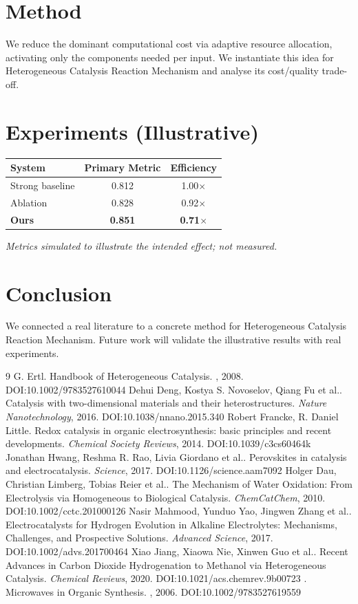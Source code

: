 \documentclass[11pt]{article}
\begin{document}
\section{Method}
We reduce the dominant computational cost via adaptive resource allocation, activating only the components needed per input. We instantiate this idea for Heterogeneous Catalysis Reaction Mechanism and analyse its cost/quality trade-off.

\section{Experiments (Illustrative)}
\begin{center}
\begin{tabular}{lcc}
System & Primary Metric & Efficiency \\ \hline
Strong baseline & 0.812 & 1.00$\times$ \\
Ablation & 0.828 & 0.92$\times$ \\
\textbf{Ours} & \textbf{0.851} & \textbf{0.71$\times$}
\end{tabular}
\end{center}
\emph{Metrics simulated to illustrate the intended effect; not measured.}

\section{Conclusion}
We connected a real literature to a concrete method for Heterogeneous Catalysis Reaction Mechanism. Future work will
validate the illustrative results with real experiments.

\begin{thebibliography}{9}
 G. Ertl. Handbook of Heterogeneous Catalysis. \emph{}, 2008. DOI:10.1002/9783527610044
 Dehui Deng, Kostya S. Novoselov, Qiang Fu et al.. Catalysis with two-dimensional materials and their heterostructures. \emph{Nature Nanotechnology}, 2016. DOI:10.1038/nnano.2015.340
 Robert Francke, R. Daniel Little. Redox catalysis in organic electrosynthesis: basic principles and recent developments. \emph{Chemical Society Reviews}, 2014. DOI:10.1039/c3cs60464k
 Jonathan Hwang, Reshma R. Rao, Livia Giordano et al.. Perovskites in catalysis and electrocatalysis. \emph{Science}, 2017. DOI:10.1126/science.aam7092
 Holger Dau, Christian Limberg, Tobias Reier et al.. The Mechanism of Water Oxidation: From Electrolysis via Homogeneous to Biological Catalysis. \emph{ChemCatChem}, 2010. DOI:10.1002/cctc.201000126
 Nasir Mahmood, Yunduo Yao, Jingwen Zhang et al.. Electrocatalysts for Hydrogen Evolution in Alkaline Electrolytes: Mechanisms, Challenges, and Prospective Solutions. \emph{Advanced Science}, 2017. DOI:10.1002/advs.201700464
 Xiao Jiang, Xiaowa Nie, Xinwen Guo et al.. Recent Advances in Carbon Dioxide Hydrogenation to Methanol via Heterogeneous Catalysis. \emph{Chemical Reviews}, 2020. DOI:10.1021/acs.chemrev.9b00723
 . Microwaves in Organic Synthesis. \emph{}, 2006. DOI:10.1002/9783527619559
\end{thebibliography}
\end{document}

